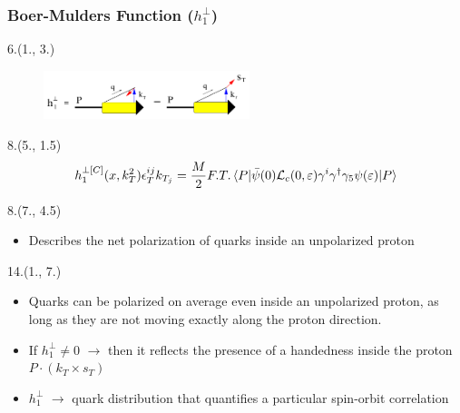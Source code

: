 \documentclass[12pt, xcolor={dvipsnames}, aspectratio = 169, sans,mathserif]{beamer}
\newenvironment{List}[2]
{\begin{textblock}{#1}#2
\begin{itemize}}
{\end{itemize}
\end{textblock}}
\newenvironment{Pic}[2]
{\begin{textblock}{#1}#2
\begin{figure}}
{\end{figure}
\end{textblock}}
\newcommand{\BeamerCite}[1]{{\tiny \footfullcite{#1}}}
\begin{document}
\begin{frame}
\frametitle{Boer-Mulders Function ($h_{1}^{\perp}$)}

\begin{Pic}{6.}{(1., 3.)}
    \includegraphics[width=6.0cm]{imgs/BMF.png}
\end{Pic}

\begin{textblock}{8.}(5., 1.5)
\begin{equation*}
h_{1}^{\perp [C]} (x, k_{T}^{2})\epsilon_{T}^{ij}k_{T_{j}} = \frac{M}{2} F.T. \braket{P|\bar{\psi}(0)\mathcal{L}_{c}(0, \varepsilon)\gamma^{i}\gamma^{\dagger}\gamma_{5}\psi(\varepsilon)|P}
\end{equation*}
\end{textblock}

\begin{List}{8.}{(7., 4.5)}

    \item  Describes the net polarization of quarks inside an unpolarized proton

\end{List}

\begin{List}{14.}{(1., 7.)}

    \item Quarks can be polarized on average even inside an unpolarized proton, as long as they are not moving exactly along the proton direction.

    \item If $h_{1}^{\perp} \neq 0$ $\rightarrow$  then it reflects the presence of a handedness inside the proton $P\cdot(k_{T} \times s_{T})$

    \item $h_{1}^{\perp}$ $\rightarrow$ quark distribution that quantifies a particular spin-orbit correlation

\end{List}

\end{frame}
\end{document}
